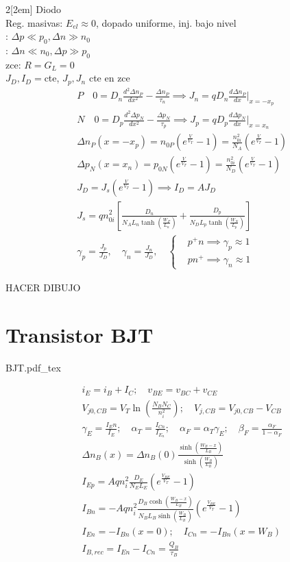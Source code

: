\documentclass[leqno]{article}
\newcommand{\incfig}[1]{%
\begin{center}
\def\svgwidth{0.9\columnwidth}
{#1.pdf_tex}
\end{center}
}
\begin{document}
\begin{multicols}{2}[\columnsep2em]
Diodo\\
Reg. masivas: $E_{el} \approx 0$, dopado uniforme, inj. bajo nivel\\
: $ \Delta p \ll p_0, \Delta n \gg n_0$\\
: $ \Delta n \ll n_0, \Delta p \gg p_0$ \\
zce: $R = G_L = 0$ \\
$J_D, I_D = $cte, $J_p, J_n$ cte en zce
\begin{align*}
& \boxed{P} \quad  0 = D_n \frac{d^2\Delta n_P}{dx^2} - \frac{\Delta n_P}{\tau_n} \implies J_n = qD_n \frac{d\Delta n_P}{dx}|_{x= -x_p}\\
& \boxed{N} \quad  0 = D_p \frac{d^2\Delta p_N}{dx^2} - \frac{\Delta p_N}{\tau_p} \implies J_p = qD_p \frac{d\Delta p_N}{dx}|_{x= x_n}\\
&\Delta n_P(x=-x_p) = n_{0P} (e ^{\frac{V}{V_T}} -1) = \frac{n_{0i}^2}{N_A}(e ^{\frac{V}{V_T}}-1)\\
&\Delta p_N(x=x_n) = p_{0N} (e ^{\frac{V}{V_T}} -1) = \frac{n_{0i}^2}{N_D}(e ^{\frac{V}{V_T}}-1)\\
&J_D = J_s (e ^{\frac{V}{V_T}} -1) \implies I_D = AJ_D\\
&J_s = q n^2_{0i} \left[ \frac{D_n}{N_A L_n \tanh \left( \frac{W_P}{L_n} \right)} + \frac{D_p}{N_DL_p \tanh \left( \frac{W_N}{L_p} \right)} \right]\\
&\gamma _{p} = \frac{J_p}{J_D}, \quad \gamma _{n} = \frac{J_n}{J_D}, \quad \begin{cases}
&p^+n \implies \gamma _p \approx 1\\
&pn^+ \implies \gamma _n \approx 1
\end{cases}
\end{align*}

HACER DIBUJO

\section{Transistor BJT}

\incfig{BJT}

\begin{align*}
&i_E = i_B + I_C; \quad v_{BE} = v_{BC} + v_{CE}\\
& V_{j0, CB} = V_T \ln \left( \frac{N_BN_C}{n_i^2} \right); \quad  V_{j, CB} = V_{j0, CB} - V_{CB}\\
&\gamma _E = \frac{I_En}{I_E}; \quad \alpha_T = \frac{I_{Cn}}{I_{E_n}}; \quad \alpha_F = \alpha_T \gamma _E; \quad \beta_F = \frac{\alpha_F}{1- \alpha_F} \\
&\Delta n_B(x) = \Delta n_B(0) \frac{\sinh \left( \frac{W_B-x}{L_B} \right)}{\sinh \left( \frac{W_B}{L_B} \right)}\\
& I_{Ep} = Aq n_i^2 \frac{D_E}{N_EL_E} \left( e ^{\frac{V_{BE}}{V_T}}-1 \right)\\
&I_{Bn} = -Aqn_i^2 \frac{D_B \cosh \left( \frac{W_B-x}{L_B} \right)}{N_BL_B \sinh \left( \frac{W_B}{L_B} \right)} \left( e ^{\frac{V_{BE}}{V_T}} -1 \right)\\
&I_{En} = -I_{Bn} (x = 0); \quad I_{Cn} = -I_{Bn}(x = W_B)\\
& I_{B,rec} = I_{En} - I_{Cn} = \frac{Q_B}{\tau _B}
\end{align*}


\end{multicols}
\end{document}
